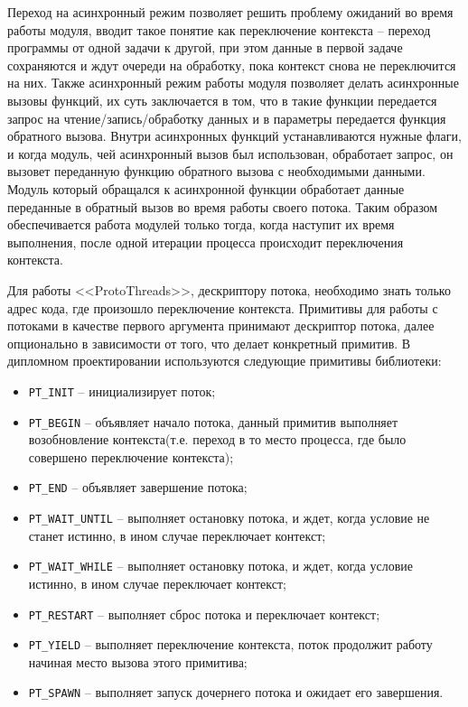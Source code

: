 Переход на асинхронный режим позволяет решить проблему ожиданий во время работы модуля, вводит такое понятие как переключение контекста -- переход программы
от одной задачи к другой, при этом данные в первой задаче сохраняются и ждут очереди на обработку, пока контекст снова не переключится на них. Также асинхронный
режим работы модуля позволяет делать асинхронные вызовы функций, их суть заключается в том, что в такие функции передается запрос на чтение/запись/обработку данных
и в параметры передается функция обратного вызова. Внутри асинхронных функций устанавливаются нужные флаги, и когда модуль, чей асинхронный вызов был использован,
обработает запрос, он вызовет переданную функцию обратного вызова с необходимыми данными. Модуль который обращался к асинхронной функции обработает данные переданные в обратный вызов
во время работы своего потока. Таким образом обеспечивается работа модулей только тогда, когда наступит их время выполнения, после одной итерации процесса происходит переключения контекста.

Для работы <<ProtoThreads>>, дескриптору потока, необходимо знать только адрес кода, где произошло переключение контекста. 
Примитивы для работы с потоками в качестве первого аргумента принимают дескриптор потока,
далее опционально в зависимости от того, что делает конкретный примитив.
В дипломном проектировании используются следующие примитивы библиотеки:

\begin{itemize}
    \item \lstinline{PT_INIT} -- инициализирует поток;
    \item \lstinline{PT_BEGIN} -- объявляет начало потока, данный примитив выполняет возобновление контекста(т.е. переход в то место процесса, где было совершено переключение контекста);
    \item \lstinline{PT_END} -- объявляет завершение потока;
    \item \lstinline{PT_WAIT_UNTIL} -- выполняет остановку потока, и ждет, когда условие не станет истинно, в ином случае переключает контекст;
    \item \lstinline{PT_WAIT_WHILE} -- выполняет остановку потока, и ждет, когда условие истинно, в ином случае переключает контекст;
    \item \lstinline{PT_RESTART} -- выполняет сброс потока и переключает контекст;
    \item \lstinline{PT_YIELD} -- выполняет переключение контекста, поток продолжит работу начиная место вызова этого примитива;
    \item \lstinline{PT_SPAWN} -- выполняет запуск дочернего потока и ожидает его завершения.
\end{itemize}

